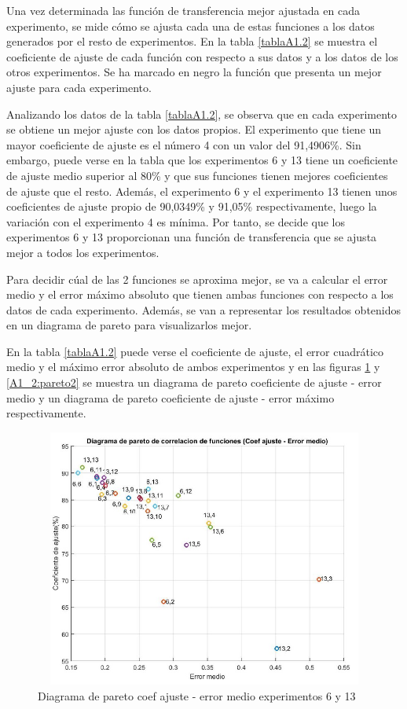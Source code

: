 	Una vez determinada las función de transferencia mejor ajustada en cada experimento, se mide cómo se ajusta cada una de estas funciones a los datos generados por el resto de experimentos. En la tabla \ref{tablaA1.2} se muestra el coeficiente de ajuste de cada función con respecto a sus datos y a los datos de los otros experimentos. Se ha marcado en negro la función que presenta un mejor ajuste para cada experimento.

Analizando los datos de la tabla \ref{tablaA1.2}, se observa que en cada experimento se obtiene un mejor ajuste con los datos propios. El experimento que tiene un mayor coeficiente de ajuste es el número 4 con un valor del 91,4906\%. Sin embargo, puede verse en la tabla que los experimentos 6 y 13 tiene un coeficiente de ajuste medio superior al 80\% y que sus funciones tienen mejores coeficientes de ajuste que el resto. Además, el experimento 6 y el experimento 13 tienen unos coeficientes de ajuste propio de 90,0349\% y 91,05\% respectivamente, luego la variación con el experimento 4 es mínima. Por tanto, se decide que los experimentos 6 y 13 proporcionan una función de transferencia que se ajusta mejor a todos los experimentos. 

	Para decidir cúal de las 2 funciones se aproxima mejor, se va a calcular el error medio y el error máximo absoluto que tienen ambas funciones con respecto a los datos de cada experimento. Además, se van a representar los resultados obtenidos en un diagrama de pareto para visualizarlos mejor. 

	En la tabla \ref{tablaA1.2} puede verse el coeficiente de ajuste, el error cuadrático medio y el máximo error absoluto de ambos experimentos y en las figuras \ref{A1_1:pareto1} y \ref{A1_2:pareto2} se muestra un diagrama de pareto coeficiente de ajuste - error medio y un diagrama de pareto coeficiente de ajuste - error máximo  respectivamente. 

\begin{figure}[H]
  \centering
  \includegraphics[width=115mm, height=85mm]{imagenes/anexo1/pareto1}
   \caption{Diagrama de pareto coef ajuste - error medio experimentos 6 y 13}
   \label{A1_1:pareto1}
\end{figure}

